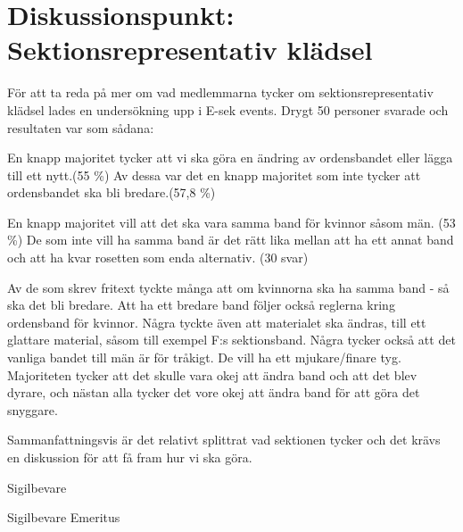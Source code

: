 \documentclass[../_main/handlingar.tex]{subfiles}
\begin{document}
\section{Diskussionspunkt: Sektionsrepresentativ klädsel}

För att ta reda på mer om vad medlemmarna tycker om sektionsrepresentativ klädsel
lades en undersökning upp i E-sek events. Drygt 50 personer svarade och resultaten var
som sådana:

En knapp majoritet tycker att vi ska göra en ändring av ordensbandet eller lägga till ett
nytt.(55 \%) Av dessa var det en knapp majoritet som inte tycker att ordensbandet ska bli
bredare.(57,8 \%)

En knapp majoritet vill att det ska vara samma band för kvinnor såsom män. (53 \%)
De som inte vill ha samma band är det rätt lika mellan att ha ett annat band och att ha
kvar rosetten som enda alternativ. (30 svar)

Av de som skrev fritext tyckte många att om kvinnorna ska ha samma band - så ska det
bli bredare. Att ha ett bredare band följer också reglerna kring ordensband för kvinnor.
Några tyckte även att materialet ska ändras, till ett glattare material, såsom till exempel
F:s sektionsband. Några tycker också att det vanliga bandet till män är för tråkigt. De vill
ha ett mjukare/finare tyg. Majoriteten tycker att det skulle vara okej att ändra band och
att det blev dyrare, och nästan alla tycker det vore okej att ändra band för att göra det
snyggare.

Sammanfattningsvis är det relativt splittrat vad sektionen tycker och det krävs en
diskussion för att få fram hur vi ska göra.


\begin{signatures}{2}
    \mvh
    \signature{Matilda Horn}{Sigilbevare}
    \signature{Henrik Ramström}{Sigilbevare Emeritus}
\end{signatures}
\end{document}
